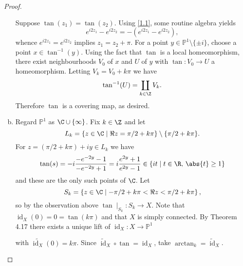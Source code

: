 \documentclass[10pt]{amsart}
\begin{document}
\begin{thm}
\begin{proof}
\begin{enumerate}[(a)]
      Suppose $\tan(z_1) = \tan(z_2)$.
      Using \eqref{1.1}, some routine algebra yields 
      $$e^{i2z_1} - e^{i2z_2} = -(e^{i2z_1} - e^{i2z_2}),$$
      whence $e^{i2z_1} = e^{i2z_2}$ implies $z_1 = z_2 + \pi$.
      For a point $y \in \mathbb{P}^1 \setminus \{\pm i\}$, choose a point $x \in \tan^{-1}(y)$.
      Using the fact that $\tan$ is a local homeomorphism, there exist neighbourhoods $V_0$ of $x$ and $U$ of $y$ with $\tan \colon V_0 \rightarrow U$ a homeomorphism.
      Letting $V_k = V_0 + k\pi$ we have
      $$\tan^{-1}(U) = \coprod_{k \in \Z} V_k.$$
      Therefore $\tan$ is a covering map, as desired.
    \item
      Regard $\mathbb{P}^1$ as $\C \cup \{\infty\}$.
      Fix $k \in \Z$ and let 
      $$L_k = \left\{z \in \C \;\middle\vert\; \Re{z} = \pi/2 + k\pi\right\} \setminus \{\pi/2 + k\pi\}.$$
      For $z = (\pi/2 + k\pi) + iy \in L_k$ we have
      $$\tan(s) = -i\frac{-e^{-2y} - 1}{-e^{-2y} + 1} = i \frac{e^{2y} + 1}{e^{2y} - 1} \in \left\{it \;\middle\vert\; t \in \R,\, \abs{t} \geq 1\right\}$$
      and these are the only such points of $\C$.
      Let
      $$S_k = \left\{z \in \C \;\middle\vert\; -\pi/2 + k\pi < \Re{z} < \pi/2 + k\pi\right\},$$
      so by the observation above $\tan \mid_{S_k} \colon S_k \rightarrow X$.
      Note that $\operatorname{id}_X(0) = 0 = \tan(k\pi)$ and that $X$ is simply connected.
      By Theorem 4.17 there exists a unique lift of $\operatorname{id}_X \colon X \rightarrow \mathbb{P}^1$
      \begin{center}
      \end{center}
      with $\tilde{\operatorname{id}_X}(0) = k\pi$.
      Since $\tilde{\operatorname{id}}_X \circ \tan = \operatorname{id}_X$, take $\arctan_k = \tilde{\operatorname{id}}_X$.
    \end{enumerate}
  \end{proof}
\end{thm}

\begin{thm}
\end{thm}
\end{document}
